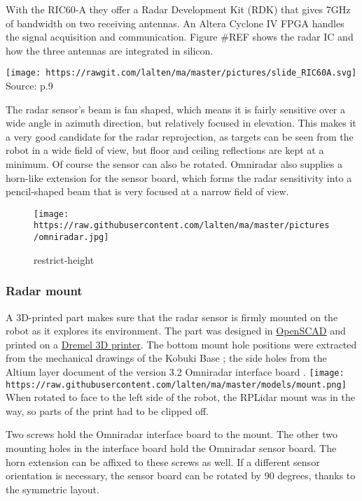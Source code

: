 With the RIC60-A they offer a Radar Development Kit (RDK) that gives
7GHz of bandwidth on two receiving antennas. An Altera Cyclone IV FPGA
handles the signal acquisition and communication. Figure \#REF shows the
radar IC and how the three antennas are integrated in silicon.

\texttt{[image: https://rawgit.com/lalten/ma/master/pictures/slide\_RIC60A.svg]}
Source: \cite{Brouwer2015} p.9

The radar sensor's beam is fan shaped, which means it is fairly
sensitive over a wide angle in azimuth direction, but relatively focused
in elevation. This makes it a very good candidate for the radar
reprojection, as targets can be seen from the robot in a wide field of
view, but floor and ceiling reflections are kept at a minimum. Of course
the sensor can also be rotated. Omniradar also supplies a horn-like
extension for the sensor board, which forms the radar sensitivity into a
pencil-shaped beam that is very focused at a narrow field of view.

\begin{figure}
\centering
\texttt{[image: https://raw.githubusercontent.com/lalten/ma/master/pictures/omniradar.jpg]}
\caption{restrict-height}
\end{figure}

\subsubsection{Radar mount}\label{radar-mount}

A 3D-printed part makes sure that the radar sensor is firmly mounted on
the robot as it explores its environment. The part was designed in
\href{http://www.openscad.org/}{OpenSCAD} and printed on a
\href{https://3dprinter.dremel.com/}{Dremel 3D printer}. The bottom
mount hole positions were extracted from the mechanical drawings of the
Kobuki Base \cite{YujinRobot2012}; the side holes from the Altium layer
document of the version 3.2 Omniradar interface board
\cite{Omniradar2014}.
\texttt{[image: https://raw.githubusercontent.com/lalten/ma/master/models/mount.png]}
When rotated to face to the left side of the robot, the RPLidar mount
was in the way, so parts of the print had to be clipped off.

Two screws hold the Omniradar interface board to the mount. The other
two mounting holes in the interface board hold the Omniradar sensor
board. The horn extension can be affixed to these screws as well. If a
different sensor orientation is necessary, the sensor board can be
rotated by 90 degrees, thanks to the symmetric layout.

